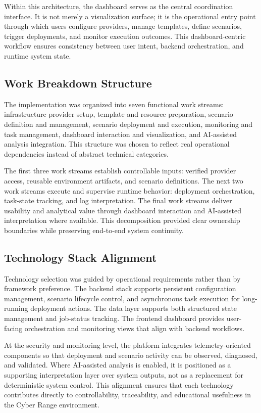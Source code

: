 Within this architecture, the dashboard serves as the central coordination interface. It is not merely a visualization surface; it is the operational entry point through which users configure providers, manage templates, define scenarios, trigger deployments, and monitor execution outcomes. This dashboard-centric workflow ensures consistency between user intent, backend orchestration, and runtime system state.

\subsection{Work Breakdown Structure}
The implementation was organized into seven functional work streams: infrastructure provider setup, template and resource preparation, scenario definition and management, scenario deployment and execution, monitoring and task management, dashboard interaction and visualization, and AI-assisted analysis integration. This structure was chosen to reflect real operational dependencies instead of abstract technical categories.

The first three work streams establish controllable inputs: verified provider access, reusable environment artifacts, and scenario definitions. The next two work streams execute and supervise runtime behavior: deployment orchestration, task-state tracking, and log interpretation. The final work streams deliver usability and analytical value through dashboard interaction and AI-assisted interpretation where available. This decomposition provided clear ownership boundaries while preserving end-to-end system continuity.

\subsection{Technology Stack Alignment}
Technology selection was guided by operational requirements rather than by framework preference. The backend stack supports persistent configuration management, scenario lifecycle control, and asynchronous task execution for long-running deployment actions. The data layer supports both structured state management and job-status tracking. The frontend dashboard provides user-facing orchestration and monitoring views that align with backend workflows.

At the security and monitoring level, the platform integrates telemetry-oriented components so that deployment and scenario activity can be observed, diagnosed, and validated. Where AI-assisted analysis is enabled, it is positioned as a supporting interpretation layer over system outputs, not as a replacement for deterministic system control. This alignment ensures that each technology contributes directly to controllability, traceability, and educational usefulness in the Cyber Range environment.


